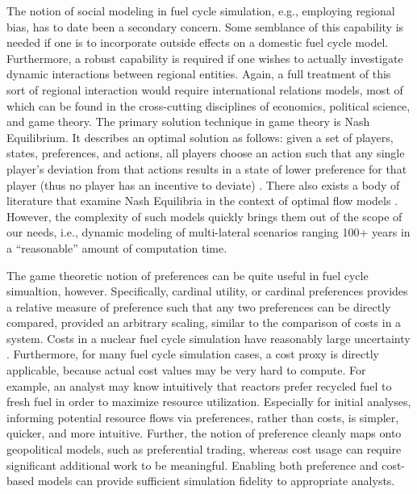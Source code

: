 The notion of social modeling in fuel cycle simulation, e.g., employing regional
bias, has to date been a secondary concern. Some semblance of this capability is
needed if one is to incorporate outside effects on a domestic fuel cycle
model. Furthermore, a robust capability is required if one wishes to actually
investigate dynamic interactions between regional entities. Again, a full
treatment of this sort of regional interaction would require international
relations models, most of which can be found in the cross-cutting disciplines of
economics, political science, and game theory. The primary solution technique in
game theory is Nash Equilibrium. It describes an optimal solution as follows:
given a set of players, states, preferences, and actions, all players choose an
action such that any single player's deviation from that actions results in a
state of lower preference for that player (thus no player has an incentive to
deviate) \cite{mccarty_political_2007}. There also exists a body of literature
that examine Nash Equilibria in the context of optimal flow models
\cite{mazumdar_fairness_1991,nagurney_supply_2002,song_nash_2002}. However, the
complexity of such models quickly brings them out of the scope of our needs,
i.e., dynamic modeling of multi-lateral scenarios ranging 100+ years in a
``reasonable'' amount of computation time. 

The game theoretic notion of preferences can be quite useful in fuel cycle
simualtion, however. Specifically, cardinal utility, or cardinal preferences
\cite{strotz_cardinal_1953} provides a relative measure of preference such that
any two preferences can be directly compared, provided an arbitrary scaling,
similar to the comparison of costs in a system. Costs in a nuclear fuel cycle
simulation have reasonably large uncertainty
\cite{shropshire_advanced_2009}. Furthermore, for many fuel cycle simulation
cases, a cost proxy is directly applicable, because actual cost values may be
very hard to compute. For example, an analyst may know intuitively that reactors
prefer recycled fuel to fresh fuel in order to maximize resource
utilization. Especially for initial analyses, informing potential resource flows
via preferences, rather than costs, is simpler, quicker, and more
intuitive. Further, the notion of preference cleanly maps onto geopolitical
models, such as preferential trading, whereas cost usage can require significant
additional work to be meaningful. Enabling both preference and cost-based models
can provide sufficient simulation fidelity to appropriate analysts.

